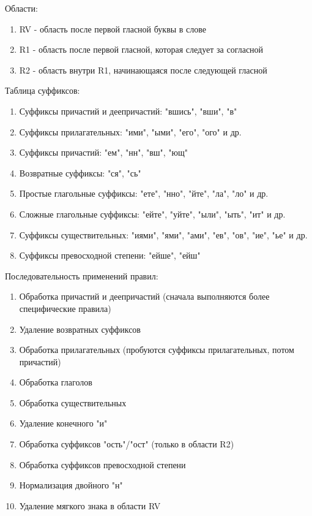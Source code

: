 \documentclass[a4paper,12pt]{article}
\begin{document}
Области:
\begin{enumerate}
    \item RV - область после первой гласной буквы в слове
    \item R1 - область после первой гласной, которая следует за согласной
    \item R2 - область внутри R1, начинающаяся после следующей гласной
\end{enumerate}

Таблица суффиксов:
\begin{enumerate}
    \item Суффиксы причастий и деепричастий: "вшись", "вши", "в"
    \item Суффиксы прилагательных: "ими", "ыми", "его", "ого" и др.
    \item Суффиксы причастий: "ем", "нн", "вш", "ющ"
    \item Возвратные суффиксы: "ся", "сь"
    \item Простые глагольные суффиксы: "ете", "нно", "йте", "ла", "ло" и др.
    \item Сложные глагольные суффиксы: "ейте", "уйте", "ыли", "ыть", "ит" и др.
    \item Суффиксы существительных: "иями", "ями", "ами", "ев", "ов", "ие", "ье" и др.
    \item Суффиксы превосходной степени: "ейше", "ейш" 
\end{enumerate}

Последовательность применений правил:
\begin{enumerate}
    \item Обработка причастий и деепричастий (сначала выполняются более специфические правила)
    \item Удаление возвратных суффиксов
    \item Обработка прилагательных (пробуются суффиксы прилагательных, потом причастий)
    \item Обработка глаголов
    \item Обработка существительных
    \item Удаление конечного "и"
    \item Обработка суффиксов "ость"/"ост" (только в области R2)
    \item Обработка суффиксов превосходной степени
    \item Нормализация двойного "н"
    \item Удаление мягкого знака в области RV
\end{enumerate}
\end{document}

